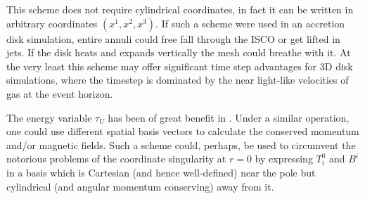 This scheme does not require cylindrical coordinates, in fact it can be written in arbitrary coordinates $(x^1, x^2, x^3)$.  If such a scheme were used in an accretion disk simulation, entire annuli could free fall through the ISCO or get lifted in jets.  If the disk heats and expands vertically the mesh could breathe with it.  At the very least this scheme may offer significant time step advantages for 3D disk simulations, where the timestep is dominated by the near light-like velocities of gas at the event horizon.

The energy variable $\tau_U$ has been of great benefit in \grdisco.  Under a similar operation, one could use different spatial basis vectors to calculate the conserved momentum and/or magnetic fields.  Such a scheme could, perhaps, be used to circumvent the notorious problems of the coordinate singularity at $r=0$ by expressing $T^0_i$ and $B^i$ in a basis which is Cartesian (and hence well-defined) near the pole but cylindrical (and angular momentum conserving) away from it.